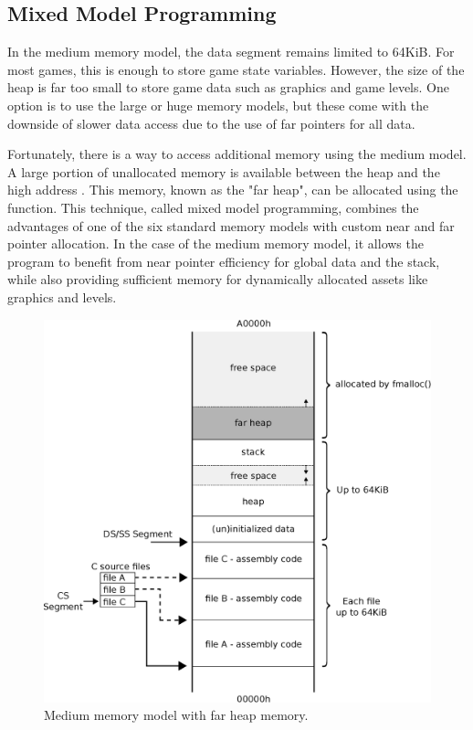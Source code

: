 \documentclass[book.tex]{subfiles}
\begin{document}
\bigskip


\subsection{Mixed Model Programming}

In the medium memory model, the data segment remains limited to 64KiB. For most games, this is enough to store game state variables. However, the size of the heap is far too small to store game data such as graphics and game levels. One option is to use the large or huge memory models, but these come with the downside of slower data access due to the use of far pointers for all data.\\


\par
Fortunately, there is a way to access additional memory using the medium model. A large portion of unallocated memory is available between the heap and the high address . This memory, known as the "far heap", can be allocated using the  function. This technique, called mixed model programming, combines the advantages of one of the six standard memory models with custom near and far pointer allocation. In the case of the medium memory model, it allows the program to benefit from near pointer efficiency for global data and the stack, while also providing sufficient memory for dynamically allocated assets like graphics and levels.\\


\begin{figure}[H]
\centering
\includegraphics[width=1.0\textwidth]{imgs/drawings/memory/farheap_medium_model.eps}
\caption{Medium memory model with far heap memory.}
\label{fig:mm_farheap}
\end{figure}
\end{document}
